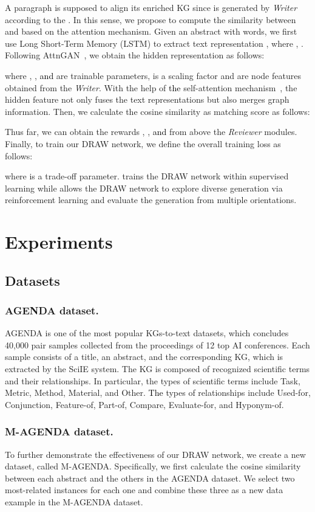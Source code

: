 \documentclass[letterpaper]{article}
\def\hmg{\textcolor{black}}
\begin{document}
A paragraph  is supposed to align its enriched KG  since  is generated by \textit{Writer} according to the . In this sense, we propose to compute the similarity between  and  based on the attention mechanism. Given an abstract  with  words, we first use Long Short-Term Memory (LSTM) to extract text representation , where ,  . Following AttnGAN~\cite{AttnGANFT}, we obtain the hidden representation as follows:

where , , \hmg{and}  are trainable parameters,  is a scaling factor and  are node features obtained from the \textit{Writer}. With the help of \hmg{the} self-attention mechanism~\cite{Vaswani2017AttentionIA}, the hidden feature  not only fuses the text representations but also merges graph information.
Then, we calculate the cosine similarity as matching score  as follows:

Thus far, we can obtain the rewards ,  , \hmg{and}
 from above the \textit{Reviewer} modules.
Finally, to train our DRAW network, we define the overall training loss as follows:

where  is a trade-off parameter.   trains the DRAW network within supervised learning while  allows the DRAW network to explore diverse generation via reinforcement learning and evaluate the generation from multiple orientations.


\section{Experiments}
\subsection{Datasets}
\subsubsection{AGENDA dataset.} 
AGENDA is one of the most popular KGs-to-text datasets, which concludes 40,000 pair samples collected from the proceedings of 12 top AI conferences.
Each sample consists of a title, an abstract, and the corresponding KG, which is extracted by the SciIE system.
The KG is composed of recognized scientific terms and their relationships.
In particular, the types of scientific terms include Task, Metric, Method, Material, and Other. \hmg{The} types of relationships include Used-for, Conjunction, Feature-of, Part-of, Compare, Evaluate-for, and Hyponym-of.

\subsubsection{M-AGENDA dataset.} 
To further demonstrate the effectiveness of our DRAW network, we create a new dataset, called M-AGENDA. 
Specifically, we first calculate the cosine similarity between each abstract and the others in the AGENDA dataset.
We select two most-related instances for each one and combine these three as a new data example in the M-AGENDA dataset.
\end{document}
